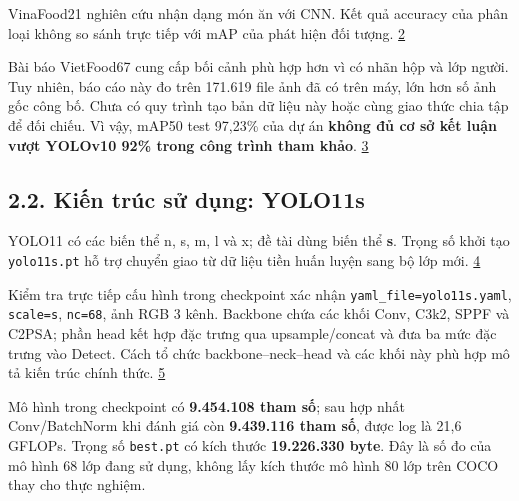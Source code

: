 \documentclass[
  vietnamese,
  12pt,
  a4paper,
]{article}
\begin{document}
\endgroup

VinaFood21 nghiên cứu nhận dạng món ăn với CNN. Kết quả accuracy của
phân loại không so sánh trực tiếp với mAP của phát hiện đối tượng.
\href{https://arxiv.org/abs/2108.02929}{2}

Bài báo VietFood67 cung cấp bối cảnh phù hợp hơn vì có nhãn hộp và lớp
người. Tuy nhiên, báo cáo này đo trên 171.619 file ảnh đã có trên máy,
lớn hơn số ảnh gốc công bố. Chưa có quy trình tạo bản dữ liệu này hoặc
cùng giao thức chia tập để đối chiếu. Vì vậy, mAP50 test 97,23\% của dự
án \textbf{không đủ cơ sở kết luận vượt YOLOv10 92\% trong công trình
tham khảo}.
\href{https://link.springer.com/chapter/10.1007/978-981-96-4288-5_35}{3}

\subsection{2.2. Kiến trúc sử dụng:
YOLO11s}\label{kiux1ebfn-truxfac-sux1eed-dux1ee5ng-yolo11s}

YOLO11 có các biến thể n, s, m, l và x; đề tài dùng biến thể \textbf{s}.
Trọng số khởi tạo
\texttt{y\allowbreak{}o\allowbreak{}l\allowbreak{}o\allowbreak{}1\allowbreak{}1\allowbreak{}s\allowbreak{}.\allowbreak{}p\allowbreak{}t\allowbreak{}}
hỗ trợ chuyển giao từ dữ liệu tiền huấn luyện sang bộ lớp mới.
\href{https://docs.ultralytics.com/models/yolo11/}{4}

Kiểm tra trực tiếp cấu hình trong checkpoint xác nhận
\texttt{y\allowbreak{}a\allowbreak{}m\allowbreak{}l\allowbreak{}\_\allowbreak{}f\allowbreak{}i\allowbreak{}l\allowbreak{}e\allowbreak{}=\allowbreak{}y\allowbreak{}o\allowbreak{}l\allowbreak{}o\allowbreak{}1\allowbreak{}1\allowbreak{}s\allowbreak{}.\allowbreak{}y\allowbreak{}a\allowbreak{}m\allowbreak{}l\allowbreak{}},
\texttt{s\allowbreak{}c\allowbreak{}a\allowbreak{}l\allowbreak{}e\allowbreak{}=\allowbreak{}s\allowbreak{}},
\texttt{n\allowbreak{}c\allowbreak{}=\allowbreak{}6\allowbreak{}8\allowbreak{}},
ảnh RGB 3 kênh. Backbone chứa các khối Conv, C3k2, SPPF và C2PSA; phần
head kết hợp đặc trưng qua upsample/concat và đưa ba mức đặc trưng vào
Detect. Cách tổ chức backbone--neck--head và các khối này phù hợp mô tả
kiến trúc chính thức.
\href{https://docs.ultralytics.com/guides/yolo-architecture/}{5}

Mô hình trong checkpoint có \textbf{9.454.108 tham số}; sau hợp nhất
Conv/BatchNorm khi đánh giá còn \textbf{9.439.116 tham số}, được log là
21,6 GFLOPs. Trọng số
\texttt{b\allowbreak{}e\allowbreak{}s\allowbreak{}t\allowbreak{}.\allowbreak{}p\allowbreak{}t\allowbreak{}}
có kích thước \textbf{19.226.330 byte}. Đây là số đo của mô hình 68 lớp
đang sử dụng, không lấy kích thước mô hình 80 lớp trên COCO thay cho
thực nghiệm.
\end{document}
